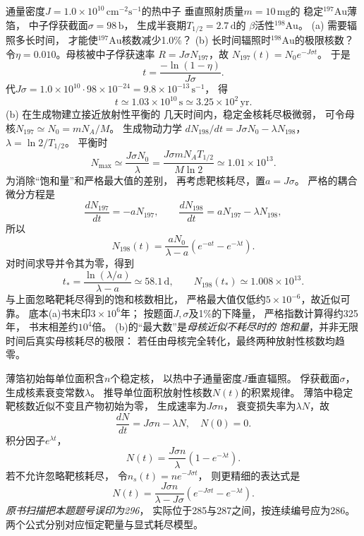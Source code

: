 通量密度$J=1.0\times10^{10}\,
\mathrm{cm^{-2}s^{-1}}$的热中子
垂直照射质量$m=10\,\mathrm{mg}$的
稳定$^{197}\mathrm{Au}$薄箔，
中子俘获截面$\sigma=98\,\mathrm b$，
生成半衰期$T_{1/2}=2.7\,\mathrm d$的
$\beta$活性$^{198}\mathrm{Au}$。
(a) 需要辐照多长时间，
才能使$^{197}\mathrm{Au}$核数减少1.0\%？
(b) 长时间辐照时$^{198}\mathrm{Au}$的极限核数？
\exsolution
令$\eta=0.010$。母核被中子俘获速率
$R=J\sigma N_{197}$，故
$N_{197}(t)=N_0e^{-J\sigma t}$。
于是
\[
 \boxed{t=\frac{-\ln(1-\eta)}{J\sigma}}.
\]
代$J\sigma=1.0\times10^{10}\cdot
98\times10^{-24}=9.8\times10^{-13}\,\mathrm{s^{-1}}$，
得
\[
 \boxed{t\simeq1.03\times10^{10}\,\mathrm s
 \simeq3.25\times10^{2}\,\mathrm{yr}}.
\]
(b) 在生成物建立接近放射性平衡的
几天时间内，稳定金核耗尽极微弱，
可令母核$N_{197}\simeq N_0=mN_A/M$。
生成物动力学
$dN_{198}/dt=J\sigma N_0-\lambda N_{198}$，
$\lambda=\ln2/T_{1/2}$。
平衡时
\[
 \boxed{N_{\max}\simeq\frac{J\sigma N_0}{\lambda}
 =\frac{J\sigma mN_A T_{1/2}}{M\ln2}
 \simeq1.01\times10^{13}}.
\]
为消除“饱和量”和严格最大值的差别，
再考虑靶核耗尽，置$a=J\sigma$。
严格的耦合微分方程是
\[
 \frac{dN_{197}}{dt}=-aN_{197},\qquad
 \frac{dN_{198}}{dt}=aN_{197}-\lambda N_{198},
\]
所以
\[
 N_{198}(t)=\frac{aN_0}{\lambda-a}
 \left(e^{-at}-e^{-\lambda t}\right).
\]
对时间求导并令其为零，得到
\[
 \boxed{t_*=\frac{\ln(\lambda/a)}{\lambda-a}
 \simeq58.1\,\mathrm d},\qquad
 \boxed{N_{198}(t_*)\simeq1.008\times10^{13}}.
\]
与上面忽略靶耗尽得到的饱和核数相比，
严格最大值仅低约$5\times10^{-6}$，故近似可靠。
\excheck 底本(a)书末印$3\times10^6$年；
按题面$J,\sigma$及1\%的下降量，
严格指数计算得约325年，
书末相差约$10^4$倍。
(b)的“最大数”是\emph{母核近似不耗尽时的
饱和量}，并非无限时间后真实母核耗尽的极限：
若任由母核完全转化，最终两种放射性核数均趋零。

薄箔初始每单位面积含$n$个稳定核，
以热中子通量密度$J$垂直辐照。
俘获截面$\sigma$，生成核素衰变常数$\lambda$。
推导单位面积放射性核数$N(t)$的积累规律。
\exsolution
薄箔中稳定靶核数近似不变且产物初始为零，
生成速率为$J\sigma n$，
衰变损失率为$\lambda N$，故
\[
 \frac{dN}{dt}=J\sigma n-\lambda N,\quad N(0)=0.
\]
积分因子$e^{\lambda t}$，
\[
 \boxed{N(t)=\frac{J\sigma n}{\lambda}
 (1-e^{-\lambda t})}.
\]
若不允许忽略靶核耗尽，
令$n_s(t)=n e^{-J\sigma t}$，
则更精细的表达式是
\[
 \boxed{N(t)=\frac{J\sigma n}{\lambda-J\sigma}
 \left(e^{-J\sigma t}-e^{-\lambda t}\right)}.
\]
\excheck \emph{原书扫描把本题题号误印为296}，
实际位于285与287之间，按连续编号应为286。
两个公式分别对应恒定靶量与显式耗尽模型。

